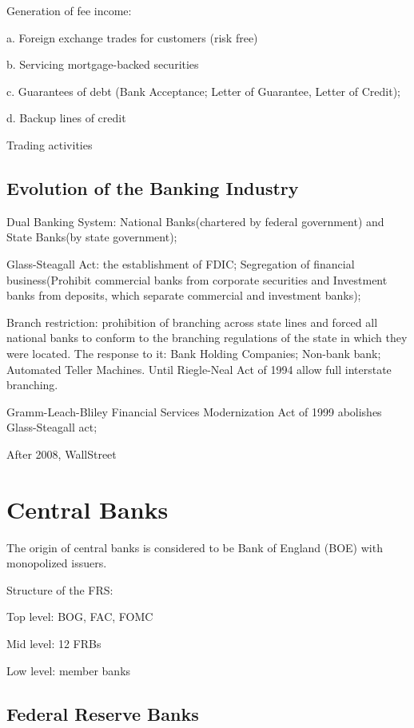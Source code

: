 \documentclass[10pt, a4paper]{article}
\begin{document}
        Generation of fee income: 
            
        \quad a. Foreign exchange trades for customers (risk free) 

        \quad b. Servicing mortgage-backed securities 

        \quad c. Guarantees of debt (Bank Acceptance; Letter of Guarantee, Letter of Credit);

        \quad d. Backup lines of credit

        Trading activities
    
    \subsection{Evolution of the Banking Industry}
        Dual Banking System: National Banks(chartered by federal government) and State Banks(by state government); 


        Glass-Steagall Act: the establishment of FDIC; Segregation of financial business(Prohibit commercial banks from corporate securities and Investment banks from deposits, which separate commercial and investment banks);
        
        Branch restriction: prohibition of branching across state lines and forced all national banks to conform to the branching regulations of the state in which they were located. The response to it: Bank Holding Companies; Non-bank  bank; Automated Teller Machines. Until Riegle-Neal Act of 1994 allow full interstate branching. 
        

        Gramm-Leach-Bliley Financial Services Modernization Act of 1999 abolishes Glass-Steagall act;
        
        After 2008, WallStreet 
\newpage
\section{Central Banks}
    The  origin of central banks is considered to be Bank of England (BOE) with monopolized issuers.

    Structure of the FRS: 
    
    \quad Top level: BOG, FAC, FOMC

    \quad Mid level: 12 FRBs 

    \quad Low level: member banks

    \subsection{Federal Reserve Banks}
\end{document}
